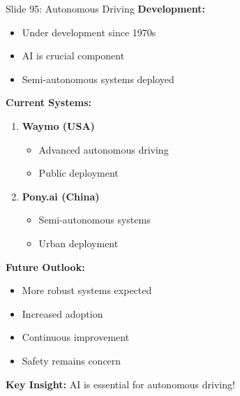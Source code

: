 \documentclass[8pt]{beamer}
\begin{document}
	\begin{frame}{Slide 95: Autonomous Driving}
		\fontsize{6.5}{7.5}\selectfont
		\textbf{Development:}
		\begin{itemize}
			\item Under development since 1970s
			\item AI is crucial component
			\item Semi-autonomous systems deployed
		\end{itemize}
		
		\vspace{0.1cm}
		\textbf{Current Systems:}
		\begin{enumerate}
			\item \textbf{Waymo (USA)}
			\begin{itemize}
				\item Advanced autonomous driving
				\item Public deployment
			\end{itemize}
			\item \textbf{Pony.ai (China)}
			\begin{itemize}
				\item Semi-autonomous systems
				\item Urban deployment
			\end{itemize}
		\end{enumerate}
		
		\vspace{0.1cm}
		\textbf{Future Outlook:}
		\begin{itemize}
			\item More robust systems expected
			\item Increased adoption
			\item Continuous improvement
			\item Safety remains concern
		\end{itemize}
		
		\textcolor{myblue}{\textbf{Key Insight:}} AI is essential for autonomous driving!
	\end{frame}
	
\end{document}
